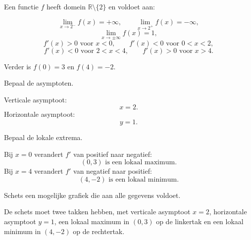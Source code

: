 \documentclass{ximera}
\begin{document}

\begin{oefening}{\oefU\ESS}
Een functie \(f\) heeft domein \(\mathbb{R}\setminus\{2\}\) en voldoet
aan:

\[
\lim_{x\to2^-}f(x)=+\infty,
\qquad
\lim_{x\to2^+}f(x)=-\infty,
\]
\[
\lim_{x\to\pm\infty}f(x)=1,
\]
\[
f'(x)>0 \text{ voor }x<0,\qquad
f'(x)<0 \text{ voor }0<x<2,
\]
\[
f'(x)<0 \text{ voor }2<x<4,\qquad
f'(x)>0 \text{ voor }x>4.
\]

Verder is \(f(0)=3\) en \(f(4)=-2\).

\begin{question}
Bepaal de asymptoten.
\begin{oplossing}
Verticale asymptoot:
\[
\boxed{x=2}.
\]
Horizontale asymptoot:
\[
\boxed{y=1}.
\]
\end{oplossing}
\end{question}

\begin{question}
Bepaal de lokale extrema.
\begin{oplossing}
Bij \(x=0\) verandert \(f'\) van positief naar negatief:
\[
\boxed{(0,3)\text{ is een lokaal maximum}.}
\]
Bij \(x=4\) verandert \(f'\) van negatief naar positief:
\[
\boxed{(4,-2)\text{ is een lokaal minimum}.}
\]
\end{oplossing}
\end{question}

\begin{question}
Schets een mogelijke grafiek die aan alle gegevens voldoet.
\begin{oplossing}
De schets moet twee takken hebben, met verticale asymptoot \(x=2\),
horizontale asymptoot \(y=1\), een lokaal maximum in \((0,3)\) op de
linkertak en een lokaal minimum in \((4,-2)\) op de rechtertak.
\end{oplossing}
\end{question}
\end{oefening}
\end{document}
